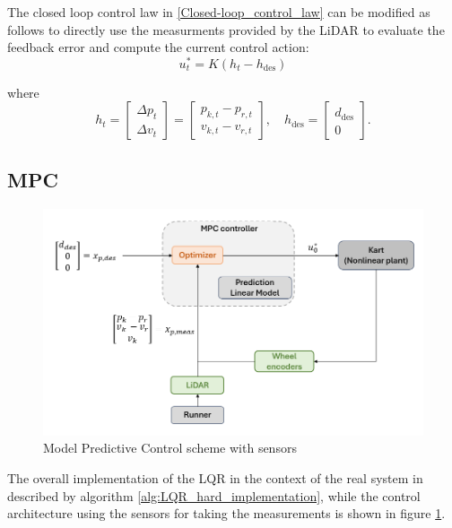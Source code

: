 \documentclass[a4paper,12pt,oneside]{book}
\begin{document}
\bigskip
The closed loop control law in \ref{Closed-loop_control_law} can be modified as follows to directly use the measurments provided by the LiDAR to evaluate the feedback error and compute the current control action:
\begin{equation}
    u_t^* = K (h_t - h_{\text{des}})
\label{Closed-loop_control_law_sensors}
\end{equation}

where 
\begin{equation}
    h_t =
    \begin{bmatrix}
        \Delta p_t  \\
        \Delta v_t
    \end{bmatrix}
	=
    \begin{bmatrix}
        p_{k,t} - p_{r,t} \\
        v_{k,t} - v_{r,t}
    \end{bmatrix},
    \quad
    h_{\text{des}} =
    \begin{bmatrix}
        d_{\text{des}} \\
        0
    \end{bmatrix}.
\end{equation}



\subsection*{MPC}
\begin{figure}
	\centering
	\includegraphics[width=1.0\textwidth]{MPC_hard_scheme.png}
	\caption{Model Predictive Control scheme with sensors}
	\label{image:MPC_hard_scheme}
\end{figure}

The overall implementation of the LQR in the context of the real system in described by algorithm \ref{alg:LQR_hard_implementation}, while the control architecture using the sensors for taking the measurements is shown in figure \ref{image:MPC_hard_scheme}.
\end{document}
